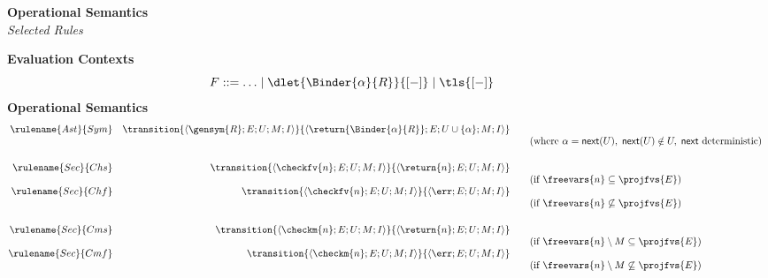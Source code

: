 \newcommand{\coreConfiguration}[5]{\langle {#1}; {#2}; {#3}; {#4}; {#5} \rangle}
  \newcommand{\astRule}[1]{\rulename{Ast}{#1}}
  \newcommand{\secRule}[1]{\rulename{Sec}{#1}}

\begin{figure}[t]
\begin{core-desc}
  \large{\textbf{Operational Semantics}}\\
  \normalsize{\textit{Selected Rules}}\\

  {
    \scriptsize

{\textbf{Evaluation Contexts}}\\
\[F ::= \ldots \mid \dlet{\Binder{\alpha}{R}}{[-]} \mid \tls{[-]} \] 
 {\textbf{Operational Semantics}}\\
\[
  \begin{array}{@{}rrcl}
  \astRule{Sym} & \transition{\coreConfiguration{\gensym{R}}{E}{U}{M}{I}}{\coreConfiguration{\return{\Binder{\alpha}{R}}}{E}{U\cup\{\alpha\}}{M}{I}}\\
  &&&\text{(where $\alpha = \textsf{next}(U), \; \textsf{next}(U) \notin U, \; \text{\textsf{next} deterministic}$)}\\
  \vspace{1mm}
  \\ 
  \secRule{Chs} & \transition{\coreConfiguration{\checkfv{n}}{E}{U}{M}{I}}{\coreConfiguration{\return{n}}{E}{U}{M}{I}}\\
    &&&\text{(if $\freevars{n} \subseteq \projfvs{E}$)}\\
  \secRule{Chf} & \transition{\coreConfiguration{\checkfv{n}}{E}{U}{M}{I}}{\coreConfiguration{\err}{E}{U}{M}{I}}\\
  &&&\text{(if $\freevars{n} \not\subseteq \projfvs{E}$)}       \\\vspace{1mm}\\
  \secRule{Cms} & \transition{\coreConfiguration{\checkm{n}}{E}{U}{M}{I}}{\coreConfiguration{\return{n}}{E}{U}{M}{I}}\\
    &&&\text{(if $\freevars{n} \setminus M \subseteq \projfvs{E}$)}\\
  \secRule{Cmf} & \transition{\coreConfiguration{\checkm{n}}{E}{U}{M}{I}}{\coreConfiguration{\err}{E}{U}{M}{I}}\\
  &&&\text{(if $\freevars{n} \setminus M \not\subseteq \projfvs{E}$)}

\end{array}\]}
\end{core-desc}
\end{figure}
